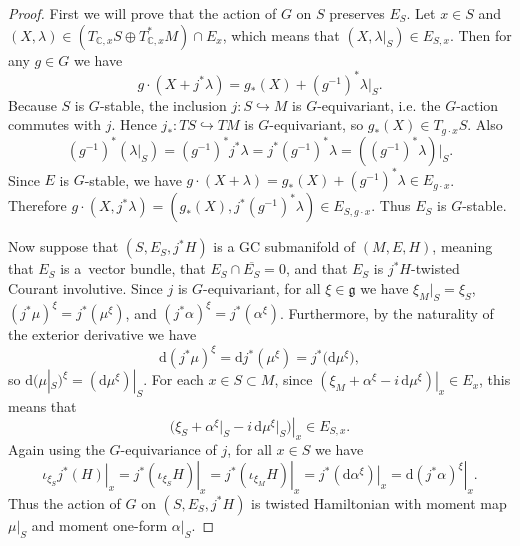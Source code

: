 \documentclass{article}
\numberwithin{equation}{section}
\newcommand{\hookfunc}[3]{#1 \colon #2 \hookrightarrow #3}
\newcommand{\eval}[2]{\left. #1 \right|_{#2}}
\newcommand{\tang}{T}
\begin{document}
\begin{proof}
First we will prove that the action of $G$ on $S$ preserves $E_S$.  Let $x \in S$ and $(X, \lambda) \in (\tang_{\mathbb{C}, x} S \oplus \tang_{\mathbb{C}, x}^{\ast} M) \cap E_x$, which means that $(X, \lambda|_S) \in E_{S,x}$.  Then for any $g \in G$ we have
\[
  g \cdot (X + j^* \lambda) = g_* (X) + (g^{-1})^* \lambda|_S.
\]
Because $S$ is $G$-stable, the inclusion $\hookfunc{j}{S}{M}$ is $G$-equivariant, i.e. the $G$-action commutes with $j$.  Hence $\hookfunc{j_*}{\tang S}{\tang M}$ is $G$-equivariant, so $g_* (X) \in \tang_{g \cdot x} S$.  Also
\[
  (g^{-1})^* \left( \lambda|_S \right)
  =
  (g^{-1})^* j^* \lambda
  =
  j^* (g^{-1})^* \lambda
  =
  \left( (g^{-1})^* \lambda \right)|_S.
\]
Since $E$ is $G$-stable, we have $g \cdot (X + \lambda) = g_* (X) + (g^{-1})^* \lambda \in E_{g \cdot x}$.  Therefore $g \cdot (X, j^* \lambda) = \left( g_* (X), j^* (g^{-1})^* \lambda \right) \in E_{S, g \cdot x}$.  Thus $E_S$ is $G$-stable.


Now suppose that $(S,E_S,j^* H)$ is a GC submanifold of $(M,E,H)$, meaning that $E_S$ is a~vector bundle, that $E_S \cap \overline{E_S} = 0$, and that $E_S$ is $j^* H$-twisted Courant involutive.  Since $j$ is $G$-equivariant, for all $\xi \in \mathfrak{g}$ we have $\xi_M|_S = \xi_S$, $(j^* \mu)^{\xi} = j^* (\mu^{\xi})$, and $(j^* \alpha)^{\xi} = j^* (\alpha^{\xi})$.  Furthermore, by the naturality of the exterior derivative we have
\[
  \mathrm{d} (j^* \mu)^{\xi}
  =
  \mathrm{d} j^* (\mu^{\xi})
  =
  j^* \big(\mathrm{d} \mu^{\xi}\big),
\]
so $\mathrm{d} (\mu|_{S})^{\xi} = (\mathrm{d} \mu^{\xi})|_S$.  For each $x \in S \subset M$, since $\eval{\left( \xi_M + \alpha^{\xi} - i \, \mathrm{d} \mu^{\xi} \right)}{x} \in E_x$, this means that
\[
  \eval{\big( \xi_S + \alpha^{\xi}|_S - i \, \mathrm{d} \mu^{\xi}\big|_S \big)}{x} \in E_{S,x}.
\]
Again using the $G$-equivariance of $j$, for all $x \in S$ we have
\[
  \eval{\iota_{\xi_S} j^* (H)}{x}
  =
  \eval{j^* (\iota_{\xi_S} H)}{x}
  =
  \eval{j^* (\iota_{\xi_M} H)}{x}
  =
  \eval{j^* (\mathrm{d} \alpha^{\xi})}{x}
  =
  \eval{\mathrm{d} (j^* \alpha)^{\xi}}{x}.
\]
Thus the action of $G$ on $(S,E_S,j^* H)$ is twisted Hamiltonian with moment map $\mu|_S$ and moment one-form $\alpha|_S$.
\end{proof}
\end{document}
